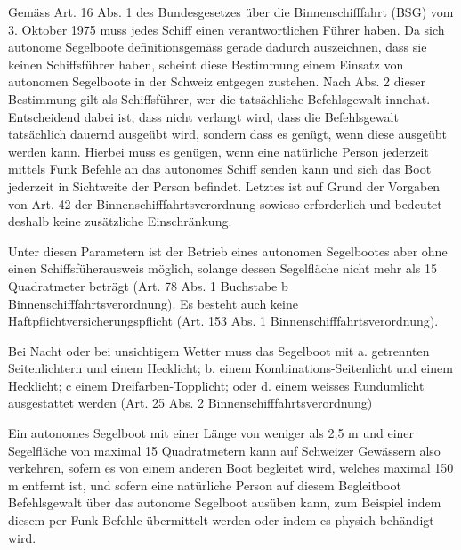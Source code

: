 Gemäss Art. 16 Abs. 1 des Bundesgesetzes über die Binnenschifffahrt (BSG) vom 3. Oktober 1975 muss jedes Schiff einen verantwortlichen Führer haben. Da sich autonome Segelboote definitionsgemäss gerade dadurch auszeichnen, dass sie keinen Schiffsführer haben, scheint diese Bestimmung einem Einsatz von autonomen Segelboote in der Schweiz entgegen zustehen. Nach Abs. 2 dieser Bestimmung gilt als Schiffsführer, wer die tatsächliche Befehlsgewalt innehat. Entscheidend dabei ist, dass nicht verlangt wird, dass die Befehlsgewalt tatsächlich dauernd ausgeübt wird, sondern dass es genügt, wenn diese ausgeübt werden kann. Hierbei muss es genügen, wenn eine natürliche Person jederzeit mittels Funk Befehle an das autonomes Schiff senden kann und sich das Boot jederzeit in Sichtweite der Person befindet. Letztes ist auf Grund der Vorgaben von Art. 42 der Binnenschifffahrtsverordnung sowieso erforderlich und bedeutet deshalb keine zusätzliche Einschränkung.

Unter diesen Parametern ist der Betrieb eines autonomen Segelbootes aber ohne einen Schiffsfüherausweis möglich, solange dessen Segelfläche nicht mehr als 15 Quadratmeter beträgt (Art. 78 Abs. 1 Buchstabe b Binnenschifffahrtsverordnung). Es besteht auch keine Haftpflichtversicherungspflicht (Art. 153 Abs. 1 Binnenschifffahrtsverordnung). 

Bei Nacht oder bei unsichtigem Wetter muss das Segelboot mit a. getrennten Seitenlichtern und einem Hecklicht; b. einem Kombinations-Seitenlicht und einem Hecklicht; c einem Dreifarben-Topplicht; oder
d. einem weisses Rundumlicht ausgestattet werden (Art. 25 Abs. 2 Binnenschifffahrtsverordnung)

Ein autonomes Segelboot mit einer Länge von weniger als 2,5 m und einer Segelfläche von maximal 15 Quadratmetern kann auf Schweizer Gewässern also verkehren, sofern es von einem anderen Boot begleitet wird, welches maximal 150 m entfernt ist, und sofern eine natürliche Person auf diesem Begleitboot Befehlsgewalt über das autonome Segelboot ausüben kann, zum Beispiel indem diesem per Funk Befehle übermittelt werden oder indem es physich behändigt wird.

